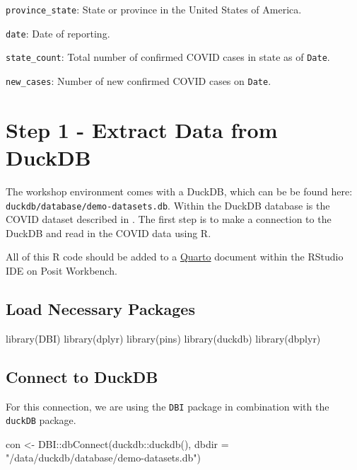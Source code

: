 \documentclass[
  letterpaper,
  DIV=11,
  numbers=noendperiod]{scrreprt}
\newenvironment{Shaded}{\begin{snugshade}}{\end{snugshade}}
\newcommand{\AttributeTok}[1]{\textcolor[rgb]{0.40,0.45,0.13}{#1}}
\newcommand{\FunctionTok}[1]{\textcolor[rgb]{0.28,0.35,0.67}{#1}}
\newcommand{\NormalTok}[1]{\textcolor[rgb]{0.00,0.23,0.31}{#1}}
\newcommand{\OtherTok}[1]{\textcolor[rgb]{0.00,0.23,0.31}{#1}}
\newcommand{\SpecialCharTok}[1]{\textcolor[rgb]{0.37,0.37,0.37}{#1}}
\newcommand{\StringTok}[1]{\textcolor[rgb]{0.13,0.47,0.30}{#1}}
\begin{document}
\texttt{province\_state}: State or province in the United States of
America.

\texttt{date}: Date of reporting.

\texttt{state\_count}: Total number of confirmed COVID cases in state as
of \texttt{Date}.

\texttt{new\_cases}: Number of new confirmed COVID cases on
\texttt{Date}.

\section{Step 1 - Extract Data from
DuckDB}\label{step-1---extract-data-from-duckdb}

The workshop environment comes with a DuckDB, which can be be found
here: \texttt{duckdb/database/demo-datasets.db}. Within the DuckDB
database is the COVID dataset described in . The first step is to make a
connection to the DuckDB and read in the COVID data using R.

All of this R code should be added to a
\href{https://quarto.org/}{Quarto} document within the RStudio IDE on
Posit Workbench.

\subsection{Load Necessary Packages}\label{load-necessary-packages}

\begin{Shaded}
\begin{Highlighting}[]
\FunctionTok{library}\NormalTok{(DBI)}
\FunctionTok{library}\NormalTok{(dplyr)}
\FunctionTok{library}\NormalTok{(pins)}
\FunctionTok{library}\NormalTok{(duckdb)}
\FunctionTok{library}\NormalTok{(dbplyr)}
\end{Highlighting}
\end{Shaded}

\subsection{Connect to DuckDB}\label{connect-to-duckdb}

For this connection, we are using the \texttt{DBI} package in
combination with the \texttt{duckDB} package.

\begin{Shaded}
\begin{Highlighting}[]
\NormalTok{con }\OtherTok{\textless{}{-}}\NormalTok{ DBI}\SpecialCharTok{::}\FunctionTok{dbConnect}\NormalTok{(duckdb}\SpecialCharTok{::}\FunctionTok{duckdb}\NormalTok{(), }\AttributeTok{dbdir =} \StringTok{"/data/duckdb/database/demo{-}datasets.db"}\NormalTok{)}
\end{Highlighting}
\end{Shaded}
\end{document}
